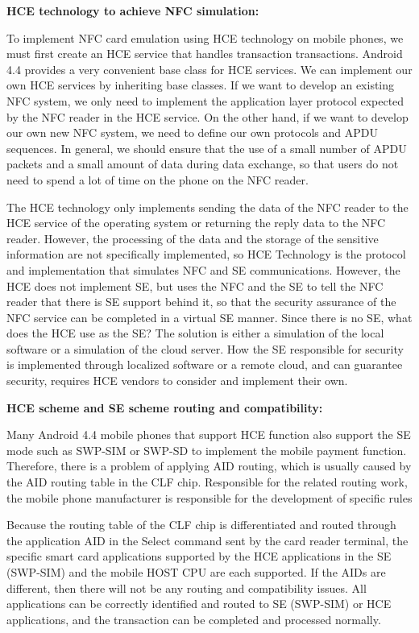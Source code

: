 \documentclass[journal]{IEEEtran}
\begin{document}
\textbf{HCE technology to achieve NFC simulation:}

To implement NFC card emulation using HCE technology on mobile phones, we must first create an HCE service that handles transaction transactions. Android 4.4 provides a very convenient base class for HCE services. We can implement our own HCE services by inheriting base classes. If we want to develop an existing NFC system, we only need to implement the application layer protocol expected by the NFC reader in the HCE service. On the other hand, if we want to develop our own new NFC system, we need to define our own protocols and APDU sequences. In general, we should ensure that the use of a small number of APDU packets and a small amount of data during data exchange, so that users do not need to spend a lot of time on the phone on the NFC reader.

The HCE technology only implements sending the data of the NFC reader to the HCE service of the operating system or returning the reply data to the NFC reader. However, the processing of the data and the storage of the sensitive information are not specifically implemented, so HCE Technology is the protocol and implementation that simulates NFC and SE communications. However, the HCE does not implement SE, but uses the NFC and the SE to tell the NFC reader that there is SE support behind it, so that the security assurance of the NFC service can be completed in a virtual SE manner. Since there is no SE, what does the HCE use as the SE? The solution is either a simulation of the local software or a simulation of the cloud server. How the SE responsible for security is implemented through localized software or a remote cloud, and can guarantee security, requires HCE vendors to consider and implement their own.

\textbf{HCE scheme and SE scheme routing and compatibility:}

Many Android 4.4 mobile phones that support HCE function also support the SE mode such as SWP-SIM or SWP-SD to implement the mobile payment function. Therefore, there is a problem of applying AID routing, which is usually caused by the AID routing table in the CLF chip. Responsible for the related routing work, the mobile phone manufacturer is responsible for the development of specific rules

Because the routing table of the CLF chip is differentiated and routed through the application AID in the Select command sent by the card reader terminal, the specific smart card applications supported by the HCE applications in the SE (SWP-SIM) and the mobile HOST CPU are each supported. If the AIDs are different, then there will not be any routing and compatibility issues. All applications can be correctly identified and routed to SE (SWP-SIM) or HCE applications, and the transaction can be completed and processed normally.
\end{document}
